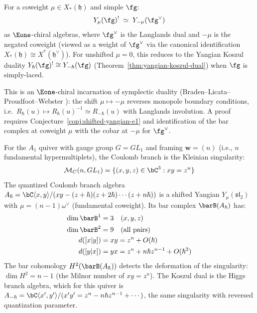 \begin{conjecture}
\label{conj:shifted-yangian-langlands}
For a coweight $\mu \in X_*(\mathfrak{h})$ and simple $\fg$:
\begin{equation}\label{eq:shifted-langlands-dual}
Y_\mu(\fg)^! \;\simeq\; Y_{-\mu}(\fg^\vee)
\end{equation}
as $\Eone$-chiral algebras, where $\fg^\vee$ is the Langlands dual and
$-\mu$ is the negated coweight (viewed as a weight of $\fg^\vee$ via
the canonical identification $X_*(\mathfrak{h}) \cong X^*(\mathfrak{h}^\vee)$).
For unshifted $\mu = 0$, this reduces to the Yangian Koszul duality
$Y_\hbar(\fg)^! \cong Y_{-\hbar}(\fg)$
(Theorem~\ref{thm:yangian-koszul-dual}) when $\fg$ is simply-laced.
\end{conjecture}

\begin{remark}[Scope]
This is an $\Eone$-chiral incarnation of symplectic duality
(Braden--Licata--Proudfoot--Webster \cite{BLPW16}): the shift
$\mu \mapsto -\mu$ reverses monopole boundary conditions, i.e.\
$R_\hbar(u) \mapsto R_\hbar(u)^{-1}\simeq R_{-\hbar}(u)$ with
Langlands involution. A proof requires
Conjecture~\ref{conj:shifted-yangian-e1} and identification of the
bar complex at coweight $\mu$ with the cobar at $-\mu$ for
$\fg^\vee$.
\end{remark}

\begin{example}[Type \texorpdfstring{$A_1$}{A_1} quiver with framing]
\label{ex:coulomb-a1-framing}
For the $A_1$ quiver with gauge group $G = GL_1$ and framing
$\mathbf{w} = (n)$ (i.e., $n$ fundamental hypermultiplets), the
Coulomb branch is the Kleinian singularity:
\[
\mathcal{M}_C(n, GL_1) = \{(x,y,z) \in \bC^3 : xy = z^n\}
\]
The quantized Coulomb branch algebra
$A_\hbar = \bC\langle x, y\rangle / (xy - (z+\hbar)(z+2\hbar)
\cdots (z+n\hbar))$ is a shifted Yangian $Y_\mu(\mathfrak{sl}_2)$
with $\mu = (n-1)\omega^\vee$ (fundamental coweight). Its bar complex
$\barB(A_\hbar)$ has:
\begin{align*}
\dim \barB^1 &= 3 \quad (x, y, z) \\
\dim \barB^2 &= 9 \quad (\text{all pairs}) \\
d([x|y]) &= xy = z^n + O(\hbar) \\
d([y|x]) &= yx = z^n + n\hbar z^{n-1} + O(\hbar^2)
\end{align*}
The bar cohomology $H^2(\barB(A_\hbar))$ detects the deformation
of the singularity: $\dim H^2 = n - 1$ (the Milnor number of $xy = z^n$).
The Koszul dual is the Higgs branch algebra, which for this quiver is
$A_{-\hbar} = \bC\langle x', y'\rangle / (x'y' = z^n - n\hbar z^{n-1}
+ \cdots)$, the same singularity with reversed quantization parameter.
\end{example}

